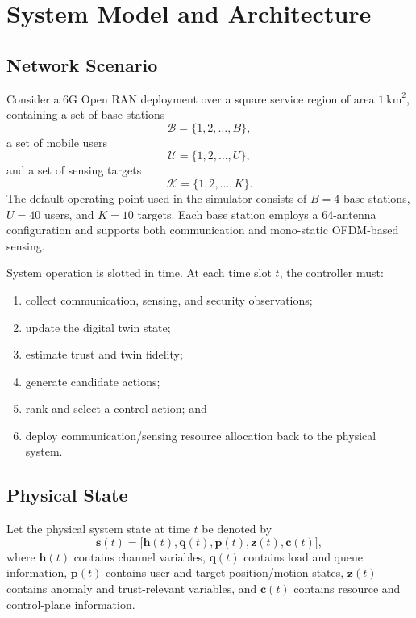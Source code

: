 \documentclass[10pt,journal]{IEEEtran}
\begin{document}
\section{System Model and Architecture}
\label{sec:system}

\subsection{Network Scenario}
Consider a 6G Open RAN deployment over a square service region of area \(1~\text{km}^2\), containing a set of base stations
\[
\mathcal{B}=\{1,2,\ldots,B\},
\]
a set of mobile users
\[
\mathcal{U}=\{1,2,\ldots,U\},
\]
and a set of sensing targets
\[
\mathcal{K}=\{1,2,\ldots,K\}.
\]
The default operating point used in the simulator consists of \(B=4\) base stations, \(U=40\) users, and \(K=10\) targets. Each base station employs a \(64\)-antenna configuration and supports both communication and mono-static OFDM-based sensing.

System operation is slotted in time. At each time slot \(t\), the controller must:
\begin{enumerate}
    \item collect communication, sensing, and security observations;
    \item update the digital twin state;
    \item estimate trust and twin fidelity;
    \item generate candidate actions;
    \item rank and select a control action; and
    \item deploy communication/sensing resource allocation back to the physical system.
\end{enumerate}

\subsection{Physical State}
Let the physical system state at time \(t\) be denoted by
\begin{equation}
\mathbf{s}(t)=\big[\mathbf{h}(t),\mathbf{q}(t),\mathbf{p}(t),\mathbf{z}(t),\mathbf{c}(t)\big],
\end{equation}
where \(\mathbf{h}(t)\) contains channel variables, \(\mathbf{q}(t)\) contains load and queue information, \(\mathbf{p}(t)\) contains user and target position/motion states, \(\mathbf{z}(t)\) contains anomaly and trust-relevant variables, and \(\mathbf{c}(t)\) contains resource and control-plane information.
\end{document}
